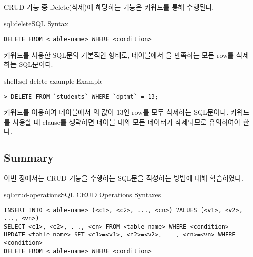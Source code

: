 CRUD 기능 중 Delete(삭제)에 해당하는 기능은  키워드를 통해 수행된다.

\begin{sqlenv}{sql:delete}{SQL  Syntax}\begin{verbatim}
DELETE FROM <table-name> WHERE <condition>
\end{verbatim}
\end{sqlenv}

\는  키워드를 사용한 SQL문의 기본적인 형태로,  테이블에서 을 만족하는 모든 row를 삭제하는 SQL문이다.

\begin{shellenv}{shell:sql-delete-example}{ Example}\begin{verbatim}
> DELETE FROM `students` WHERE `dptmt` = 13;
\end{verbatim}
\end{shellenv}

\은  키워드를 이용하여  테이블에서 의 값이 13인 row를 모두 삭제하는 SQL문이다.  키워드를 사용할 때  clause를 생략하면 테이블 내의 모든 데이터가 삭제되므로 유의하여야 한다.

\subsection*{Summary}

이번 장에서는 CRUD 기능을 수행하는 SQL문을 작성하는 방법에 대해 학습하였다.

\begin{sqlenv}{sql:crud-operations}{SQL CRUD Operations Syntaxes}\begin{verbatim}
INSERT INTO <table-name> (<c1>, <c2>, ..., <cn>) VALUES (<v1>, <v2>, ..., <vn>)
SELECT <c1>, <c2>, ..., <cn> FROM <table-name> WHERE <condition>
UPDATE <table-name> SET <c1>=<v1>, <c2>=<v2>, ..., <cn>=<vn> WHERE <condition>
DELETE FROM <table-name> WHERE <condition>
\end{verbatim}
\end{sqlenv}
